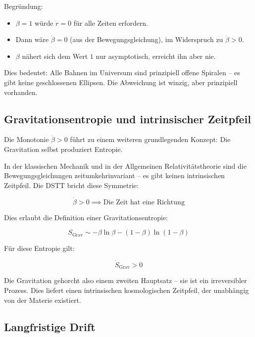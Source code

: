 \documentclass[12pt,a4paper]{article}
\begin{document}
Begründung:
\begin{itemize}
\item $\beta = 1$ würde $\dot{r} = 0$ für alle Zeiten erfordern.
\item Dann wäre $\dot{\beta} = 0$ (aus der Bewegungsgleichung), im Widerspruch zu $\dot{\beta} > 0$.
\item $\beta$ nähert sich dem Wert $1$ nur asymptotisch, erreicht ihn aber nie.
\end{itemize}

Dies bedeutet: Alle Bahnen im Universum sind prinzipiell offene Spiralen -- es gibt keine geschlossenen Ellipsen. Die Abweichung ist winzig, aber prinzipiell vorhanden.

\subsection{Gravitationsentropie und intrinsischer Zeitpfeil}

Die Monotonie $\dot{\beta} > 0$ führt zu einem weiteren grundlegenden Konzept: Die Gravitation selbst produziert Entropie.

In der klassischen Mechanik und in der Allgemeinen Relativitätstheorie sind die Bewegungsgleichungen zeitumkehrinvariant -- es gibt keinen intrinsischen Zeitpfeil. Die DSTT bricht diese Symmetrie:

\begin{equation}
\dot{\beta} > 0 \implies \text{Die Zeit hat eine Richtung}
\end{equation}

Dies erlaubt die Definition einer Gravitationsentropie:

\begin{equation}
S_{\text{Grav}} \sim -\beta \ln \beta - (1 - \beta) \ln(1 - \beta)
\end{equation}

Für diese Entropie gilt:

\begin{equation}
\dot{S}_{\text{Grav}} > 0
\end{equation}

Die Gravitation gehorcht also einem zweiten Hauptsatz -- sie ist ein irreversibler Prozess. Dies liefert einen intrinsischen kosmologischen Zeitpfeil, der unabhängig von der Materie existiert.

\subsection{Langfristige Drift}
\end{document}
